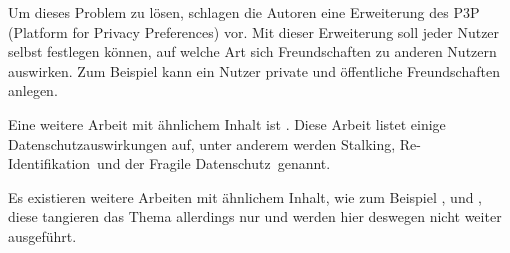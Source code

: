 Um dieses Problem zu lösen, schlagen die Autoren eine Erweiterung des P3P (Platform for Privacy Preferences) vor. Mit dieser Erweiterung soll jeder Nutzer selbst festlegen können, auf welche Art sich Freundschaften zu anderen Nutzern auswirken. Zum Beispiel kann ein Nutzer private und öffentliche Freundschaften anlegen.

Eine weitere Arbeit mit ähnlichem Inhalt ist \citet{gross2005information}. Diese Arbeit listet einige Datenschutzauswirkungen auf, unter anderem werden \glqq Stalking\grqq , \glqq Re-Identifikation\grqq\ und der \glqq Fragile Datenschutz\grqq\ genannt.

Es existieren weitere Arbeiten mit ähnlichem Inhalt, wie zum Beispiel \citet{hintz2014AGB}, \citet{mahmood2011privacy} und \citet{hintzPhishing}, diese tangieren das Thema allerdings nur und werden hier deswegen nicht weiter ausgeführt.